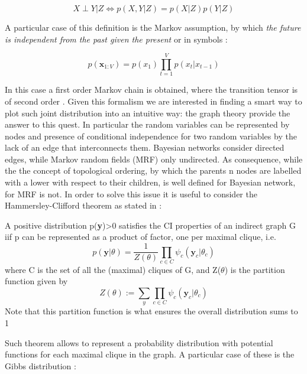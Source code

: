 \documentclass[12pt,%
               a4paper,%
               oneside,openany,%
               titlepage,%
               headinclude,footinclude,%
               BCOR5mm,%
               cleardoublepage=empty,%
               tablecaptionabove,%
               floatperchapter,
               ]{scrreprt}                 %
\begin{document}
\begin{equation}
X  \perp Y| Z \iff  p(X,Y|Z) = p(X|Z)p(Y|Z)
\end{equation}

A particular case of this definition is the Markov assumption,  by which \textit{the future is independent from the past given the present } or in symbols \cite{murphy2012machine}: 

\begin{equation}
p(\textbf{x}_{1:V})=p(x_{1})\prod^{V}_{t=1}p(x_{t}|x_{t-1})
\end{equation}

In this case a first order Markov chain is obtained,  where the transition tensor is of second order \cite{wu2017markov}.  Given this formalism we are interested in finding a smart way to plot such joint distribution into an intuitive way: the graph theory provide the answer to this quest.  In particular the random variables can be represented by nodes and presence of conditional independence for two random variables by the lack of an edge that interconnects them.  Bayesian networks consider directed edges,  while Markov random fields (MRF) only undirected.  As consequence,  while the the concept of topological ordering,  by which the parents n nodes are labelled with a lower  with respect to their children,  is well defined for Bayesian network,  for MRF is not.  In order to solve this issue it is useful to consider the Hammersley-Clifford theorem as stated in \cite{murphy2012machine}:

\begin{theorem}
A positive distribution p(\textbf{y})>0 satisfies the CI properties of an indirect graph G iif p can be represented as a product of factor, one per maximal clique,  i.e.
\begin{equation}
p(\textbf{y}|\theta)= \dfrac{1}{Z(\theta)}\prod_{c \in C }\psi_{c}(\textbf{y}_{c}|\theta_{c})
\end{equation}
where C is the set of all the (maximal) cliques of G,  and Z($\theta$) is the partition function given by 
\begin{equation}
Z(\theta):= \sum_{y}\prod_{c\in C}\psi_{c}(\textbf{y}_{c}|\theta_{c})
\end{equation}
Note that this partition function is what ensures the overall distribution sums to 1
\end{theorem}

Such theorem allows to represent a probability distribution with potential functions for each maximal clique in the graph.  A particular case of these is the Gibbs distribution \cite{murphy2012machine}: 
\end{document}
